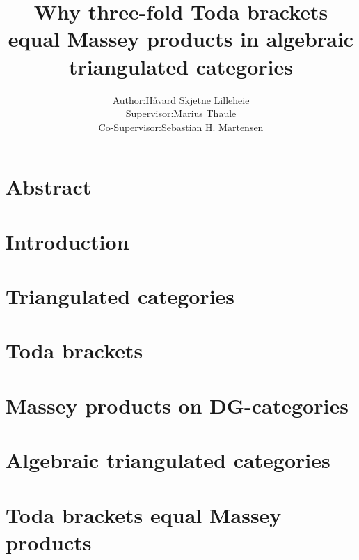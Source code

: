 \documentclass[a4paper, 10pt]{article}
\title{Why three-fold Toda brackets equal Massey products in algebraic triangulated categories}
\author{
    \begin{tabular}{rl}
        Author:& Håvard Skjetne Lilleheie\\
        Supervisor:& Marius Thaule\\
        Co-Supervisor:& Sebastian H. Martensen
    \end{tabular}
}
\begin{document}
\maketitle

\tableofcontents

\section*{Abstract}


\section{Introduction}


\section{Triangulated categories}
\label{section:tri_cats}


\section{Toda brackets}
\label{section:toda_brackets}


\section{Massey products on DG-categories}
\label{section:massey_prods_on_dg_cats}


\section{Algebraic triangulated categories}
\label{section:alg_tri_cats}


\section{Toda brackets equal Massey products}
\label{section:toda_eq_massey}


{}

\end{document}
